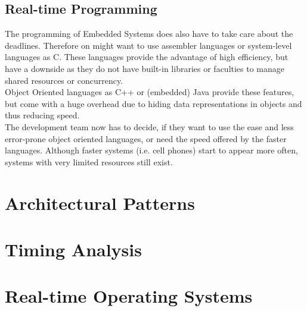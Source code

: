 \documentclass[10pt,a4paper,titlepage,draft]{report} %
\begin{document}
\subsection{Real-time Programming}
The programming of Embedded Systems does also have to take care about the deadlines.
Therefore on might want to use assembler languages or system-level languages as C.
These languages provide the advantage of high efficiency, but have a downside as they do not have built-in libraries or faculties to manage shared resources or concurrency. \\
Object Oriented languages as C++ or (embedded) Java provide these features, but come with a huge overhead due to hiding data representations in objects and thus reducing speed. \\
The development team now has to decide, if they want to use the ease and less error-prone object oriented languages, or need the speed offered by the faster languages.
Although faster systems (i.e. cell phones) start to appear more often, systems with very limited resources still exist.


\section{Architectural Patterns}

\section{Timing Analysis}

\section{Real-time Operating Systems}

\end{document}
